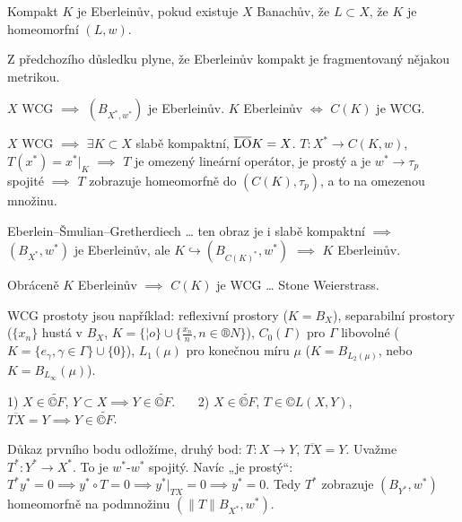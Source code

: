 \documentclass[12pt]{article}					%
\begin{document}
\begin{definice}
	Kompakt $K$ je Eberleinův, pokud existuje $X$ Banachův, že $L \subset X$, že $K$ je homeomorfní $(L, w)$.
\end{definice}

\begin{poznamka}
	Z předchozího důsledku plyne, že Eberleinův kompakt je fragmentovaný nějakou metrikou.
\end{poznamka}

\begin{tvrzeni}
	$X$ WCG $\implies$ $(B_{X^*, w^*})$ je Eberleinův. $K$ Eberleinův $\Leftrightarrow$ $C(K)$ je WCG.

	\begin{dukazin}
		$X$ WCG $\implies$ $\exists K \subset X$ slabě kompaktní, $\overline{\operatorname{LO}} K = X$. $T: X^* \rightarrow C(K, w)$, $T(x^*) = x^*|_K$ $\implies$ $T$ je omezený lineární operátor, je prostý a je $w^* \rightarrow τ_p$ spojité $\implies$ $T$ zobrazuje homeomorfně do $(C(K), τ_p)$, a to na omezenou množinu.

		Eberlein–Šmulian–Gretherdiech … ten obraz je i slabě kompaktní $\implies$ $(B_{X^*}, w^*)$ je Eberleinův, ale $K \hookrightarrow (B_{C(K)^*}, w^*)$ $\implies$ $K$ Eberleinův.

		Obráceně $K$ Eberleinův $\implies$ $C(K)$ je WCG … Stone Weierstrass.
	\end{dukazin}
\end{tvrzeni}

\begin{priklady}
	WCG prostoty jsou například: reflexivní prostory ($K = B_X$), separabilní prostory ($\{x_n\}$ hustá v $B_X$, $K = \{¦o\} \cup \{\frac{x_n}{n}, n \in ®N\}$), $C_0(Γ)$ pro $Γ$ libovolné ($K = \{e_γ, γ \in Γ\} \cup \{0\}$), $L_1(μ)$ pro konečnou míru $μ$ ($K = B_{L_2(μ)}$, nebo $K = B_{L_∞}(μ)$).
\end{priklady}

\begin{tvrzeni}
	1) $X \in \tilde{©F}$, $Y \subset X \implies Y \in \tilde{©F}$. \ \ \ 2) $X \in \tilde{©F}$, $T \in ©L(X, Y)$, $\overline{TX} = Y \implies Y \in \tilde{©F}$.

	\begin{dukazin}
		Důkaz prvního bodu odložíme, druhý bod: $T: X \rightarrow Y$, $\overline{TX} = Y$. Uvažme $T^*: Y^* \rightarrow X^*$. To je $w^*$-$w^*$ spojitý. Navíc „je prostý“: $T^* y^* = 0 \implies y^* ∘ T = 0 \implies y^*|_{TX} = 0 \implies y^* = 0$. Tedy $T^*$ zobrazuje $(B_{Y^*}, w^*)$ homeomorfně na podmnožinu $(\|T\| B_{X^*}, w^*)$.
	\end{dukazin}
\end{tvrzeni}
\end{document}
